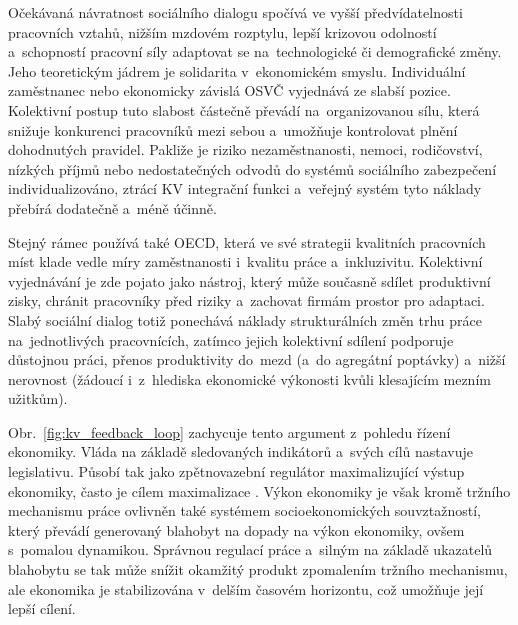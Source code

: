 Očekávaná návratnost sociálního dialogu spočívá ve vyšší předvídatelnosti pracovních vztahů, nižším mzdovém rozptylu, lepší krizovou odolností a~schopností pracovní síly adaptovat se na~technologické či demografické změny. Jeho teoretickým jádrem je solidarita v~ekonomickém smyslu. Individuální zaměstnanec nebo ekonomicky závislá \ac{OSVČ} vyjednává ze slabší pozice. Kolektivní postup tuto slabost částečně převádí na~organizovanou sílu, která snižuje konkurenci pracovníků mezi sebou a~umožňuje kontrolovat plnění dohodnutých pravidel. Pakliže je riziko nezaměstnanosti, nemoci, rodičovství, nízkých příjmů nebo nedostatečných odvodů do systémů sociálního zabezpečení individualizováno, ztrácí \ac{KV} integrační funkci a~veřejný systém tyto náklady přebírá dodatečně a~méně účinně.\par
Stejný rámec používá také \ac{OECD}, která ve své strategii kvalitních pracovních míst klade vedle míry zaměstnanosti i~kvalitu práce a~inkluzivitu. Kolektivní vyjednávání je zde pojato jako nástroj, který může současně sdílet produktivní zisky, chránit pracovníky před riziky a~zachovat firmám prostor pro adaptaci. Slabý sociální dialog totiž ponechává náklady strukturálních změn trhu práce na~jednotlivých pracovnících, zatímco jejich kolektivní sdílení podporuje důstojnou práci, přenos produktivity do~mezd (a~do agregátní poptávky) a~nižší nerovnost (žádoucí i~z~hlediska ekonomické výkonosti kvůli klesajícím mezním užitkům).~\cite{OECD_GoodJobsForAll_2018}\par
\newpage
Obr.~\ref{fig:kv_feedback_loop} zachycuje tento argument z~pohledu řízení ekonomiky. Vláda na základě sledovaných indikátorů a~svých cílů nastavuje legislativu. Působí tak jako zpětnovazební regulátor maximalizující výstup ekonomiky, často je cílem maximalizace . Výkon ekonomiky je však kromě tržního mechanismu práce ovlivněn také systémem socioekonomických souvztažností, který převádí generovaný blahobyt na dopady na výkon ekonomiky, ovšem s~pomalou dynamikou. Správnou regulací práce a~silným  na základě ukazatelů blahobytu se tak může snížit okamžitý produkt zpomalením tržního mechanismu, ale ekonomika je stabilizována v~delším časovém horizontu, což umožňuje její lepší cílení.\par



